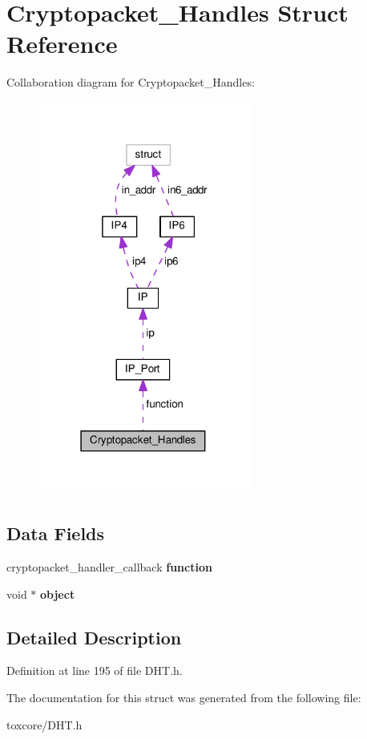 \hypertarget{struct_cryptopacket___handles}{\section{Cryptopacket\+\_\+\+Handles Struct Reference}
\label{struct_cryptopacket___handles}
}


Collaboration diagram for Cryptopacket\+\_\+\+Handles\+:\nopagebreak
\begin{figure}[H]
\begin{center}
\leavevmode
\includegraphics[width=198pt]{struct_cryptopacket___handles__coll__graph}
\end{center}
\end{figure}
\subsection*{Data Fields}
\begin{DoxyCompactItemize}
\item 
\hypertarget{struct_cryptopacket___handles_a9313784040f9666743d9aff915543903}{cryptopacket\+\_\+handler\+\_\+callback {\bfseries function}}\label{struct_cryptopacket___handles_a9313784040f9666743d9aff915543903}

\item 
\hypertarget{struct_cryptopacket___handles_a077376d12464f945e2414d5499c79b3f}{void $\ast$ {\bfseries object}}\label{struct_cryptopacket___handles_a077376d12464f945e2414d5499c79b3f}

\end{DoxyCompactItemize}


\subsection{Detailed Description}


Definition at line 195 of file D\+H\+T.\+h.



The documentation for this struct was generated from the following file\+:\begin{DoxyCompactItemize}
\item 
toxcore/D\+H\+T.\+h\end{DoxyCompactItemize}
